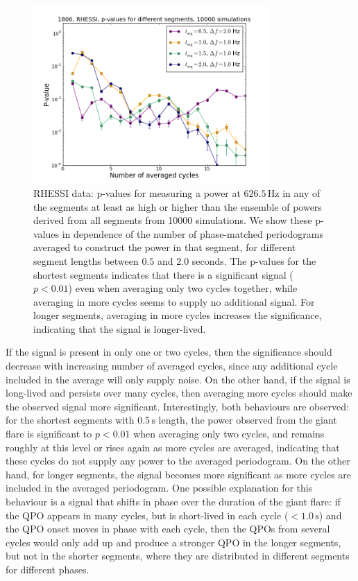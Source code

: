 \documentclass{emulateapj}
\begin{document}
\begin{figure}[htbp]
\begin{center}
\includegraphics[width=9cm]{1806_rhessi_pvalues.png}
\caption{RHESSI data: p-values for measuring a power at $626.5\, \mathrm{Hz}$ in any of the segments at least as high or higher than the ensemble of powers derived from all segments from 10000 simulations. We show these p-values in dependence of the number of phase-matched periodograms averaged to construct the power in that segment, for different segment lengths between $0.5$ and $2.0$ seconds. The p-values for the shortest segments indicates that there is a significant signal ($p < 0.01$) even when averaging only two cycles together, while averaging in more cycles seems to supply no additional signal. For longer segments, averaging in more cycles increases the significance, indicating that the signal is longer-lived.}
\label{fig:rhessi_pvalues}
\end{center}
\end{figure}

If the signal is present in only one or two cycles, then the significance should decrease with increasing number of averaged cycles, since any additional cycle included in the average will only supply noise. On the other hand, if the signal is long-lived and persists over many cycles, then averaging more cycles should make the observed signal more significant. Interestingly, both behaviours are observed: for the shortest segments with $0.5\, \mathrm{s}$ length, the power observed from the giant flare is significant to $p < 0.01$ when averaging only two cycles, and remains roughly at this level or rises again as more cycles are averaged, indicating that these cycles do not supply any power to the averaged periodogram. On the other hand, for longer segments, the signal becomes more significant as more cycles are included in the averaged periodogram. One possible explanation for this behaviour is a signal that shifts in phase over the duration of the giant flare: if the QPO appears in many cycles, but is short-lived in each cycle ($<1.0 \, \mathrm{s}$) and the QPO onset moves in phase with each cycle, then the QPOs from several cycles would only add up and produce a stronger QPO in the longer segments, but not in the shorter segments, where they are distributed in different segments for different phases. 
\end{document}
